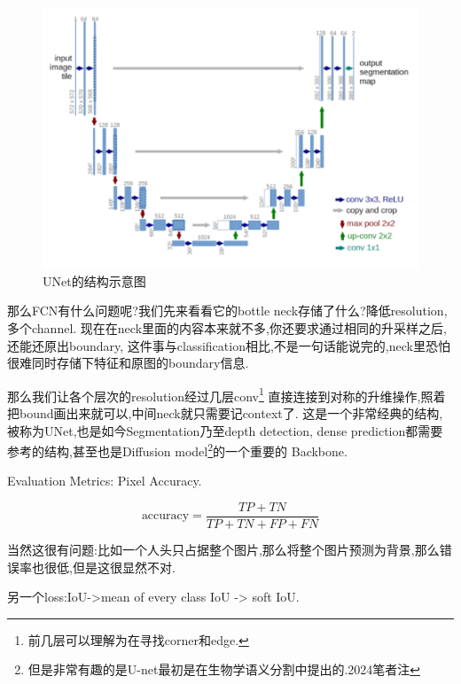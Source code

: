 \begin{figure}
	\includegraphics[scale=0.4]{figures/UNetstructure.png}
	\caption{UNet的结构示意图}
\end{figure}

那么FCN有什么问题呢?我们先来看看它的bottle neck存储了什么?降低resolution,多个channel.
现在在neck里面的内容本来就不多,你还要求通过相同的升采样之后,还能还原出boundary,
这件事与classification相比,不是一句话能说完的,neck里恐怕很难同时存储下特征和原图的boundary信息.


那么我们让各个层次的resolution经过几层conv\footnote{前几层可以理解为在寻找corner和edge.}
直接连接到对称的升维操作,照着把bound画出来就可以,中间neck就只需要记context了.
这是一个非常经典的结构,被称为UNet,也是如今Segmentation乃至depth detection,
dense prediction都需要参考的结构,甚至也是Diffusion model\footnote{但是非常有趣的是U-net最初是在生物学语义分割中提出的.2024笔者注}的一个重要的 Backbone.


Evaluation Metrics: Pixel Accuracy.

\begin{equation}
	\text{accuracy} = \frac{TP+TN}{TP+TN+FP+FN}
\end{equation}

当然这很有问题:比如一个人头只占据整个图片,那么将整个图片预测为背景,那么错误率也很低,但是这很显然不对.

另一个loss:IoU->mean of every class IoU -> soft IoU.